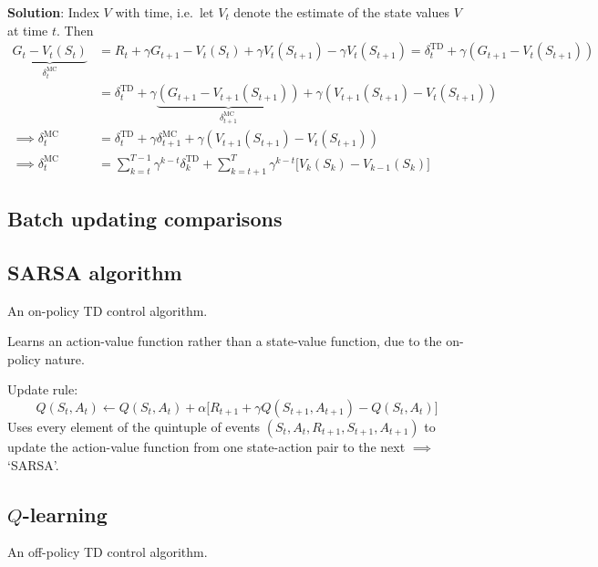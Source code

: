 \textbf{Solution}:
Index \( V \) with time, i.e.\ let \( V_t \) denote the estimate of the state values \( V \) at time \( t \).
Then
\begin{align*}
    \underbrace{ G_t - V_t(S_t) }_{\delta_{t}^{\text{MC}}}
     & =
    R_t + \gamma G_{t+1} - V_t(S_t) + \gamma V_t(S_{t+1}) - \gamma V_t(S_{t+1})
    =
    \delta_{t}^{\text{TD}} + \gamma (G_{t+1} - V_t(S_{t+1}))
    \\ & =
    \delta_{t}^{\text{TD}} + \gamma \underbrace{ (G_{t+1} - V_{t+1}(S_{t+1})) }_{\delta_{t+1}^{\text{MC}}} + \gamma (V_{t+1}(S_{t+1}) - V_t(S_{t+1}))
    \\
    \implies
    \delta_{t}^{\text{MC}}
     & =
    \delta_{t}^{\text{TD}} + \gamma \delta_{t+1}^{\text{MC}} + \gamma (V_{t+1}(S_{t+1}) - V_t(S_{t+1}))
    \\
    \implies
    \delta_{t}^{\text{MC}}
     & =
    \sum_{k = t}^{T-1} \gamma^{k-t} \delta_{k}^{\text{TD}} + \boxed{ \sum_{k = t+1}^{T} \gamma^{k-t} \big[ V_{k}(S_{k}) - V_{k-1}(S_{k}) \big] }
\end{align*}

\subsection{Batch updating comparisons}

\subsection{SARSA algorithm}

An on-policy TD control algorithm.

Learns an action-value function rather than a state-value function, due to the on-policy nature.

Update rule:
\begin{equation}
    Q(S_t, A_t) \leftarrow Q(S_t, A_t) + \alpha \Big[ R_{t+1} + \gamma Q(S_{t+1}, A_{t+1}) - Q(S_t, A_t) \Big]
\end{equation}
Uses every element of the quintuple of events \( (S_t, A_t, R_{t+1}, S_{t+1}, A_{t+1}) \) to update the action-value function from one state-action pair to the next \( \implies \) `SARSA'.

\subsection{\texorpdfstring{\( Q \)-learning}{Q-learning}}

An off-policy TD control algorithm.

